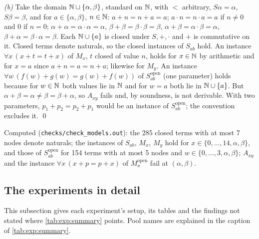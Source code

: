 \emph{(b)} Take the domain $\mathbb{N}\sqcup\{\alpha,\beta\}$, standard on $\mathbb{N}$, with $<$ arbitrary, $S\alpha=\alpha$, $S\beta=\beta$, and for $a\in\{\alpha,\beta\}$, $n\in\mathbb{N}$: $a+n=n+a=a$; $a\cdot n=n\cdot a=a$ if $n\ne0$ and $0$ if $n=0$; $\alpha+\alpha=\alpha\cdot\alpha=\alpha$, $\beta+\beta=\beta\cdot\beta=\beta$, $\alpha+\beta=\alpha\cdot\beta=\alpha$, $\beta+\alpha=\beta\cdot\alpha=\beta$. Each $\mathbb{N}\cup\{a\}$ is closed under $S,+,\cdot$ and $+$ is commutative on it. Closed terms denote naturals, so the closed instances of $S_{ab}$ hold. An instance $\forall x\,(x+t=t+x)$ of $M_x$, $t$ closed of value $n$, holds for $x\in\mathbb{N}$ by arithmetic and for $x=a$ since $a+n=a=n+a$; likewise for $M_y$. An instance $\forall w\,(f(w)+g(w)=g(w)+f(w))$ of $S_{ab}^{\mathrm{open}}$ (one parameter) holds because for $w\in\mathbb{N}$ both values lie in $\mathbb{N}$ and for $w=a$ both lie in $\mathbb{N}\cup\{a\}$. But $\alpha+\beta=\alpha\ne\beta=\beta+\alpha$, so $A_{xy}$ fails and, by soundness, is not derivable. With two parameters, $p_1+p_2=p_2+p_1$ would be an instance of $S_{ab}^{\mathrm{open}}$; the convention excludes it. \qed

\noindent Computed (\texttt{checks/check\_models.out}): the 285 closed terms with at most 7 nodes denote naturals; the instances of $S_{ab}$, $M_x$, $M_y$ hold for $x\in\{0,\dots,14,\alpha,\beta\}$, and those of $S_{ab}^{\mathrm{open}}$ for 154 terms with at most 5 nodes and $w\in\{0,\dots,3,\alpha,\beta\}$; $A_{xy}$ and the instance $\forall x\,(x+p=p+x)$ of $M_x^{\mathrm{open}}$ fail at $(\alpha,\beta)$.

\subsection{The experiments in detail}\label{app:exp:results}

This subsection gives each experiment's setup, its tables and the findings not stated where \cref{tab:exp:summary} points. Pool names are explained in the caption of \cref{tab:exp:summary}.

